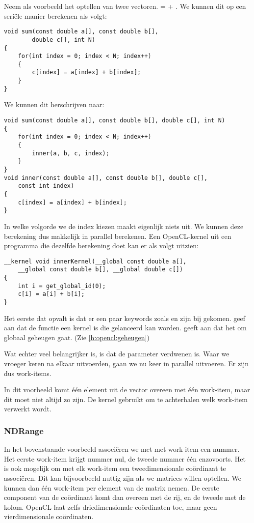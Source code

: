 Neem als voorbeeld het optellen van twee vectoren.  =  + . We kunnen dit op een seri\"ele manier berekenen als volgt:
\lstset{language=C, basicstyle=\footnotesize\ttfamily, keepspaces=true}
\begin{lstlisting}
void sum(const double a[], const double b[],
        double c[], int N)
{
    for(int index = 0; index < N; index++)
    {
        c[index] = a[index] + b[index];
    }
}
\end{lstlisting}
We kunnen dit herschrijven naar:
\begin{lstlisting}
void sum(const double a[], const double b[], double c[], int N)
{
    for(int index = 0; index < N; index++)
    {
        inner(a, b, c, index);
    }
}
void inner(const double a[], const double b[], double c[],
    const int index)
{
    c[index] = a[index] + b[index];
}
\end{lstlisting}
In welke volgorde we de index kiezen maakt eigenlijk niets uit. We kunnen deze berekening dus makkelijk in parallel berekenen.
Een OpenCL-kernel uit een programma die dezelfde berekening doet kan er als volgt uitzien:
\begin{lstlisting}
__kernel void innerKernel(__global const double a[],
    __global const double b[], __global double c[])
{
	int i = get_global_id(0);
	c[i] = a[i] + b[i];
}
\end{lstlisting}
Het eerste dat opvalt is dat er een paar keywords zoals  en  zijn bij gekomen.  geef aan dat de functie een kernel is die gelanceerd kan worden.  geeft aan dat het om globaal geheugen gaat. (Zie \ref{h:opencl:geheugen})

Wat echter veel belangrijker is, is dat de parameter  verdwenen is. Waar we vroeger   keren na elkaar uitvoerden, gaan we nu   keer in parallel uitvoeren. Er zijn dus  work-items. 

In dit voorbeeld komt \'e\'en element uit de vector overeen met \'e\'en work-item, maar dit moet niet altijd zo zijn. De kernel gebruikt  om te achterhalen welk work-item verwerkt wordt.

\subsubsection{NDRange}
In het bovenstaande voorbeeld associ\"eren we met met work-item een nummer. Het eerste work-item krijgt nummer nul, de tweede nummer \'e\'en enzovoorts. Het is ook mogelijk om met elk work-item een tweedimensionale co\"ordinaat te associ\"eren. Dit kan bijvoorbeeld nuttig zijn als we matrices willen optellen. We kunnen dan \'e\'en work-item per element van de matrix nemen. De eerste component van de co\"ordinaat komt dan overeen met de rij, en de tweede met de kolom. OpenCL laat zelfs driedimensionale co\"ordinaten toe, maar geen vierdimensionale co\"ordinaten.

